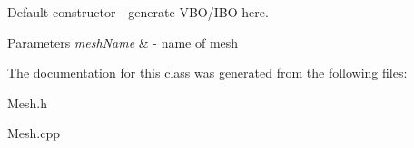 Default constructor -\/ generate V\+B\+O/\+I\+B\+O here. 


\begin{DoxyParams}{Parameters}
{\em mesh\+Name} & -\/ name of mesh \\
\hline
\end{DoxyParams}


The documentation for this class was generated from the following files\+:\begin{DoxyCompactItemize}
\item 
Mesh.\+h\item 
Mesh.\+cpp\end{DoxyCompactItemize}
